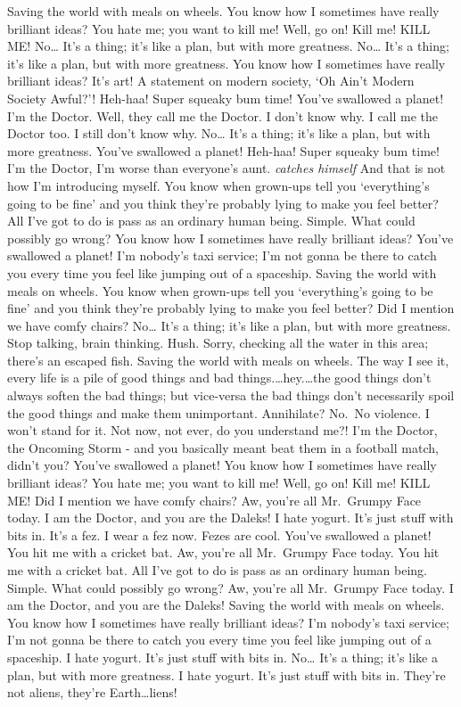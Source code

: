 \documentclass[
]{report}
\begin{document}
Saving the world with meals on wheels. You know how I sometimes have
really brilliant ideas? You hate me; you want to kill me! Well, go on!
Kill me! KILL ME! No\ldots{} It's a thing; it's like a plan, but with
more greatness. No\ldots{} It's a thing; it's like a plan, but with more
greatness. You know how I sometimes have really brilliant ideas? It's
art! A statement on modern society, `Oh Ain't Modern Society Awful?'!
Heh-haa! Super squeaky bum time! You've swallowed a planet! I'm the
Doctor. Well, they call me the Doctor. I don't know why. I call me the
Doctor too. I still don't know why. No\ldots{} It's a thing; it's like a
plan, but with more greatness. You've swallowed a planet! Heh-haa! Super
squeaky bum time! I'm the Doctor, I'm worse than everyone's aunt.
\emph{catches himself} And that is not how I'm introducing myself. You
know when grown-ups tell you `everything's going to be fine' and you
think they're probably lying to make you feel better? All I've got to do
is pass as an ordinary human being. Simple. What could possibly go
wrong? You know how I sometimes have really brilliant ideas? You've
swallowed a planet! I'm nobody's taxi service; I'm not gonna be there to
catch you every time you feel like jumping out of a spaceship. Saving
the world with meals on wheels. You know when grown-ups tell you
`everything's going to be fine' and you think they're probably lying to
make you feel better? Did I mention we have comfy chairs? No\ldots{}
It's a thing; it's like a plan, but with more greatness. Stop talking,
brain thinking. Hush. Sorry, checking all the water in this area;
there's an escaped fish. Saving the world with meals on wheels. The way
I see it, every life is a pile of good things and bad
things.\ldots{}hey.\ldots{}the good things don't always soften the bad
things; but vice-versa the bad things don't necessarily spoil the good
things and make them unimportant. Annihilate? No.~No violence. I won't
stand for it. Not now, not ever, do you understand me?! I'm the Doctor,
the Oncoming Storm - and you basically meant beat them in a football
match, didn't you? You've swallowed a planet! You know how I sometimes
have really brilliant ideas? You hate me; you want to kill me! Well, go
on! Kill me! KILL ME! Did I mention we have comfy chairs? Aw, you're all
Mr.~Grumpy Face today. I am the Doctor, and you are the Daleks! I hate
yogurt. It's just stuff with bits in. It's a fez. I wear a fez now.
Fezes are cool. You've swallowed a planet! You hit me with a cricket
bat. Aw, you're all Mr.~Grumpy Face today. You hit me with a cricket
bat. All I've got to do is pass as an ordinary human being. Simple. What
could possibly go wrong? Aw, you're all Mr.~Grumpy Face today. I am the
Doctor, and you are the Daleks! Saving the world with meals on wheels.
You know how I sometimes have really brilliant ideas? I'm nobody's taxi
service; I'm not gonna be there to catch you every time you feel like
jumping out of a spaceship. I hate yogurt. It's just stuff with bits in.
No\ldots{} It's a thing; it's like a plan, but with more greatness. I
hate yogurt. It's just stuff with bits in. They're not aliens, they're
Earth\ldots{}liens!
\end{document}
